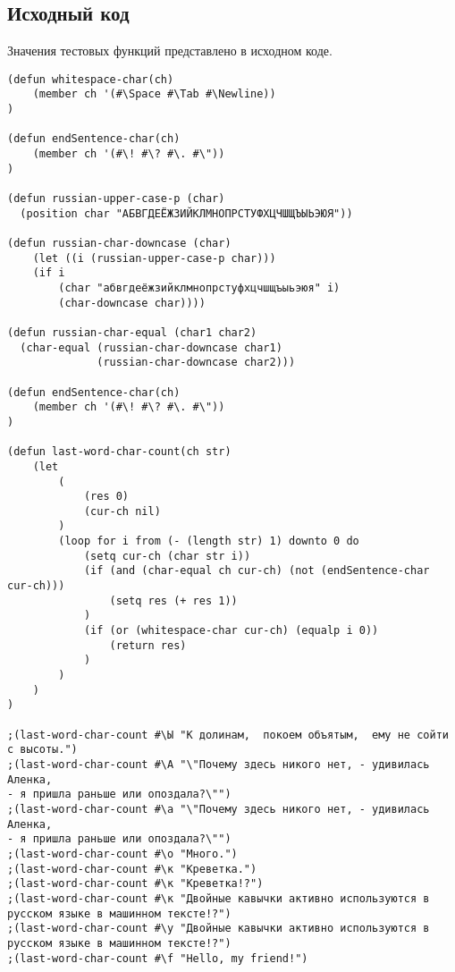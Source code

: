 \documentclass[12pt]{article}
\begin{document}
\subsection{Исходный код}
Значения тестовых функций представлено в исходном коде.
\begin{verbatim}
(defun whitespace-char(ch)
    (member ch '(#\Space #\Tab #\Newline))
)

(defun endSentence-char(ch)
    (member ch '(#\! #\? #\. #\"))
)

(defun russian-upper-case-p (char)
  (position char "АБВГДЕЁЖЗИЙКЛМНОПРСТУФХЦЧШЩЪЫЬЭЮЯ"))

(defun russian-char-downcase (char)
	(let ((i (russian-upper-case-p char)))
    (if i 
        (char "абвгдеёжзийклмнопрстуфхцчшщъыьэюя" i)
        (char-downcase char))))  

(defun russian-char-equal (char1 char2)
  (char-equal (russian-char-downcase char1)
              (russian-char-downcase char2)))

(defun endSentence-char(ch)
	(member ch '(#\! #\? #\. #\"))
)

(defun last-word-char-count(ch str)
    (let
        (
            (res 0)
            (cur-ch nil)
        )
        (loop for i from (- (length str) 1) downto 0 do
            (setq cur-ch (char str i))	
            (if (and (char-equal ch cur-ch) (not (endSentence-char cur-ch)))
                (setq res (+ res 1))
            )	
            (if (or (whitespace-char cur-ch) (equalp i 0))
                (return res)
            )
        )
    )
)

;(last-word-char-count #\Ы "К долинам,  покоем объятым,  ему не сойти с высоты.")
;(last-word-char-count #\А "\"Почему здесь никого нет, - удивилась Аленка,
- я пришла раньше или опоздала?\"")
;(last-word-char-count #\а "\"Почему здесь никого нет, - удивилась Аленка,
- я пришла раньше или опоздала?\"")
;(last-word-char-count #\о "Много.")
;(last-word-char-count #\к "Креветка.")
;(last-word-char-count #\к "Креветка!?")
;(last-word-char-count #\к "Двойные кавычки активно используются в 
русском языке в машинном тексте!?")
;(last-word-char-count #\у "Двойные кавычки активно используются в
русском языке в машинном тексте!?")
;(last-word-char-count #\f "Hello, my friend!")

\end{verbatim}
%
\end{document}
